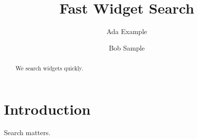 \documentclass[sigconf,nonacm]{acmart}
\begin{document}
\title{Fast Widget Search}
\author{Ada Example}
\author{Bob Sample}
\begin{abstract}
We search widgets quickly.
\end{abstract}
\maketitle
\section{Introduction}
Search matters.
\end{document}
